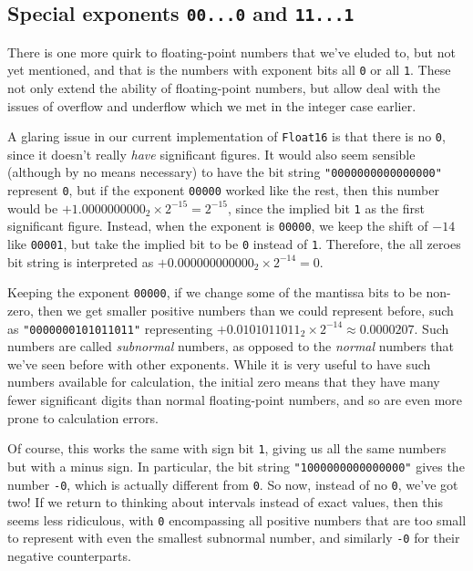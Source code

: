 \documentclass[
  letterpaper,
  DIV=11,
  numbers=noendperiod]{scrreprt}
\begin{document}
\hypertarget{special-exponents-00...0-and-11...1}{%
\subsection{\texorpdfstring{Special exponents \texttt{00...0} and
\texttt{11...1}}{Special exponents 00...0 and 11...1}}\label{special-exponents-00...0-and-11...1}}

There is one more quirk to floating-point numbers that we've eluded to,
but not yet mentioned, and that is the numbers with exponent bits all
\texttt{0} or all \texttt{1}. These not only extend the ability of
floating-point numbers, but allow deal with the issues of overflow and
underflow which we met in the integer case earlier.

A glaring issue in our current implementation of \texttt{Float16} is
that there is no \texttt{0}, since it doesn't really \emph{have}
significant figures. It would also seem sensible (although by no means
necessary) to have the bit string \texttt{"0000000000000000"} represent
\texttt{0}, but if the exponent \texttt{00000} worked like the rest,
then this number would be \(+1.0000000000_2 \times 2^{-15} = 2^{-15}\),
since the implied bit \texttt{1} as the first significant figure.
Instead, when the exponent is \texttt{00000}, we keep the shift of
\(-14\) like \texttt{00001}, but take the implied bit to be \texttt{0}
instead of \texttt{1}. Therefore, the all zeroes bit string is
interpreted as \(+0.000000000000_2 \times 2^{-14} = 0\).

Keeping the exponent \texttt{00000}, if we change some of the mantissa
bits to be non-zero, then we get smaller positive numbers than we could
represent before, such as \texttt{"0000000101011011"} representing
\(+0.0101011011_2 \times 2^{-14} \approx 0.0000207\). Such numbers are
called \emph{subnormal} numbers, as opposed to the \emph{normal} numbers
that we've seen before with other exponents. While it is very useful to
have such numbers available for calculation, the initial zero means that
they have many fewer significant digits than normal floating-point
numbers, and so are even more prone to calculation errors.

Of course, this works the same with sign bit \texttt{1}, giving us all
the same numbers but with a minus sign. In particular, the bit string
\texttt{"1000000000000000"} gives the number \texttt{-0}, which is
actually different from \texttt{0}. So now, instead of no \texttt{0},
we've got two! If we return to thinking about intervals instead of exact
values, then this seems less ridiculous, with \texttt{0} encompassing
all positive numbers that are too small to represent with even the
smallest subnormal number, and similarly \texttt{-0} for their negative
counterparts.
\end{document}
